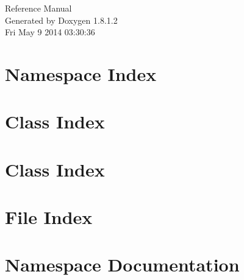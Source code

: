 \documentclass{book}
\begin{document}
\hypersetup{pageanchor=false,citecolor=blue}
\begin{titlepage}
\vspace*{7cm}
\begin{center}
{\Large Reference Manual}\\
\vspace*{1cm}
{\large Generated by Doxygen 1.8.1.2}\\
\vspace*{0.5cm}
{\small Fri May 9 2014 03:30:36}\\
\end{center}
\end{titlepage}
\clearemptydoublepage
{}
\tableofcontents
\clearemptydoublepage
{}
\hypersetup{pageanchor=true,citecolor=blue}
\chapter{Namespace Index}

\chapter{Class Index}

\chapter{Class Index}

\chapter{File Index}

\chapter{Namespace Documentation}






\end{document}
